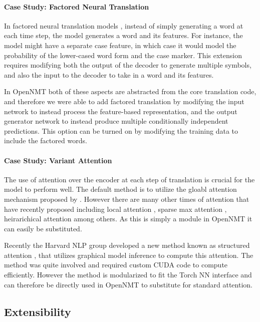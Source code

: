 \documentclass[11pt]{article}
\begin{document}
\paragraph{Case Study: Factored Neural Translation}

In factored neural translation models \cite{}, instead of simply
generating a word at each time step, the model generates a word and
its features. For instance, the model might have a separate case
feature, in which case it would model the probability of the
lower-cased word form and the case marker. This extension requires
modifying both the output of the decoder to generate multiple symbols,
and also the input to the decoder to take in a word and its features.

In OpenNMT both of these aspects are abstracted from the core
translation code, and therefore we were able to add factored
translation by modifying the input network to instead process the
feature-based representation, and the output generator network to
instead produce multiple conditionally independent predictions.  This
option can be turned on by modifying the training data to include the
factored words.


\paragraph{Case Study: Variant Attention}

The use of attention over the encoder at each step of translation is
crucial for the model to perform well. The default method is to
utilize the gloabl attention mechanism proposed by \cite{}. However
there are many other times of attention that have recently proposed
including local attention \cite{}, sparse max attention \cite{},
heirarichical attention \cite{} among others. As this is simply a
module in OpenNMT it can easily be substituted. 

Recently the Harvard NLP group developed a new method known as
structured attention \cite{}, that utilizes graphical model inference
to compute this attention. The method was quite involved and required
custom CUDA code to compute efficiently. However the method is
modularized to fit the Torch NN interface and can therefore be
directly used in OpenNMT to substitute for standard attention.


\subsection{Extensibility}
\end{document}
